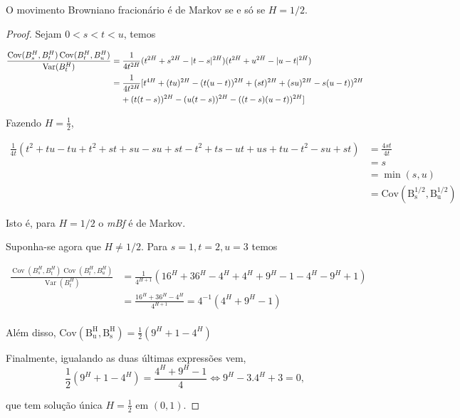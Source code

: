 \documentclass{article}
\begin{document}
\begin{thm}
    O movimento Browniano fracionário é de Markov se e só se $H=1/2$.
\end{thm}
\begin{proof}

    Sejam $0<s<t<u$, temos

    \begin{align*}
        \frac{\operatorname{Cov}(B^H_s,B^H_t)\operatorname{Cov}(B^H_t,B^H_u)}{\operatorname{Var}(B^H_t)}&=\frac{1}{4t^{2H}}(t^{2H}+s^{2H}-|t-s|^{2H})(t^{2H}+u^{2H}-|u-t|^{2H})\\
        &=\frac{1}{4t^{2H}} [ t^{4H}+(tu)^{2H}-(t(u-t))^{2H}+(st)^{2H}+(su)^{2H}-s(u-t))^{2H}\\
        &\hspace{0.4cm}+(t(t-s))^{2H}-(u(t-s))^{2H}-((t-s)(u-t))^{2H} ]
    \end{align*}
    

Fazendo $H=\frac{1}{2}$,

\begin{align*}
    \frac{1}{4t} (t^2+tu-tu+t^2+st+su-su+st-t^2+ts-ut+us+tu-t^2-su+st )&=\frac{4st}{4t}\\ 
                                                                        & =s\\
                                                                        &=\min(s,u)\\
                                                                        &=\operatorname{Cov(B^{1/2}_s,B_u^{1/2})}
\end{align*}

Isto é, para $H=1/2$ o \textit{mBf} é de Markov.

Suponha-se agora que $H \neq 1/2$. Para $s=1,t=2,u=3$ temos

\begin{align*}
    \frac{\operatorname{Cov}(B^H_s,B^H_t)\operatorname{Cov}(B^H_t,B^H_u)}{\operatorname{Var}(B^H_t)}&=\frac{1}{4^{H+1}}(16^H+36^H-4^H+4^H+9^H-1-4^H-9^H+1)\\
    &=\frac{16^H+36^H-4^H}{4^{H+1}}=4^{-1}(4^H+9^H-1)\\
\end{align*}

Além disso, $\operatorname{Cov(B_u^H,B_s^H)}=\frac{1}{2}(9^H+1-4^H)$

Finalmente, igualando as duas últimas expressões vem,
$$\frac{1}{2}(9^H+1-4^H)=\frac{4^H+9^H-1}{4} \Leftrightarrow 9^H-3.4^H+3=0,$$

que tem solução única $H=\frac{1}{2}$ em $(0,1)$.
\end{proof}
\end{document}
